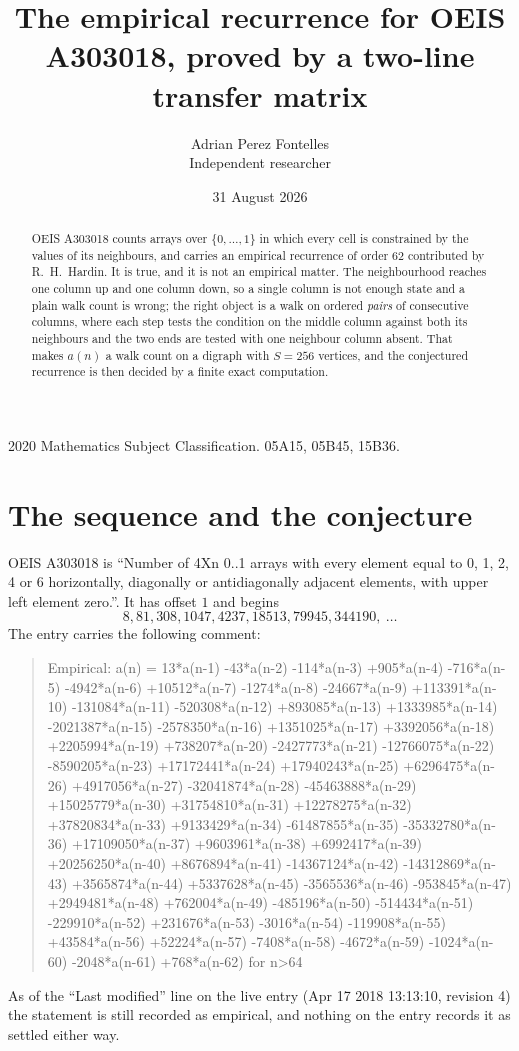 \documentclass[11pt,a4paper]{article}
\title{The empirical recurrence for OEIS A303018, proved by a two-line transfer matrix}
\author{Adrian Perez Fontelles\\ \small Independent researcher}
\date{31 August 2026}
\theoremstyle{plain}
\theoremstyle{definition}
\begin{document}
\maketitle

\begin{abstract}
OEIS A303018 counts arrays over $\{0,\dots,1\}$ in which every cell is constrained by the
values of its neighbours, and carries an empirical recurrence of order $62$ contributed
by R.~H.~Hardin. It is true, and it is not an empirical matter. The neighbourhood reaches one
column up and one column down, so a single column is not enough state and a plain walk count
is wrong; the right object is a walk on ordered \emph{pairs} of consecutive columns, where
each step tests the condition on the middle column against both its neighbours and the two
ends are tested with one neighbour column absent. That makes $a(n)$ a walk count on a digraph
with $S=256$ vertices, and the conjectured recurrence is then decided by a finite exact
computation.
\end{abstract}

\noindent\small 2020 Mathematics Subject Classification. 05A15, 05B45, 15B36.\normalsize

\section{The sequence and the conjecture}

OEIS A303018 is ``Number of 4Xn 0..1 arrays with every element equal to 0, 1, 2, 4 or 6 horizontally, diagonally or antidiagonally adjacent elements, with upper left element zero.''. It has offset $1$ and begins
\[
8, 81, 308, 1047, 4237, 18513, 79945, 344190,\ \dots
\]
The entry carries the following comment:
\begin{quote}\small
Empirical: a(n) = 13*a(n-1) -43*a(n-2) -114*a(n-3) +905*a(n-4) -716*a(n-5) -4942*a(n-6) +10512*a(n-7) -1274*a(n-8) -24667*a(n-9) +113391*a(n-10) -131084*a(n-11) -520308*a(n-12) +893085*a(n-13) +1333985*a(n-14) -2021387*a(n-15) -2578350*a(n-16) +1351025*a(n-17) +3392056*a(n-18) +2205994*a(n-19) +738207*a(n-20) -2427773*a(n-21) -12766075*a(n-22) -8590205*a(n-23) +17172441*a(n-24) +17940243*a(n-25) +6296475*a(n-26) +4917056*a(n-27) -32041874*a(n-28) -45463888*a(n-29) +15025779*a(n-30) +31754810*a(n-31) +12278275*a(n-32) +37820834*a(n-33) +9133429*a(n-34) -61487855*a(n-35) -35332780*a(n-36) +17109050*a(n-37) +9603961*a(n-38) +6992417*a(n-39) +20256250*a(n-40) +8676894*a(n-41) -14367124*a(n-42) -14312869*a(n-43) +3565874*a(n-44) +5337628*a(n-45) -3565536*a(n-46) -953845*a(n-47) +2949481*a(n-48) +762004*a(n-49) -485196*a(n-50) -514434*a(n-51) -229910*a(n-52) +231676*a(n-53) -3016*a(n-54) -119908*a(n-55) +43584*a(n-56) +52224*a(n-57) -7408*a(n-58) -4672*a(n-59) -1024*a(n-60) -2048*a(n-61) +768*a(n-62) for n>64
\end{quote}
As of the ``Last modified'' line on the live entry (Apr 17 2018 13:13:10, revision 4) the statement is
still recorded as empirical, and nothing on the entry records it as settled either way.
\end{document}
